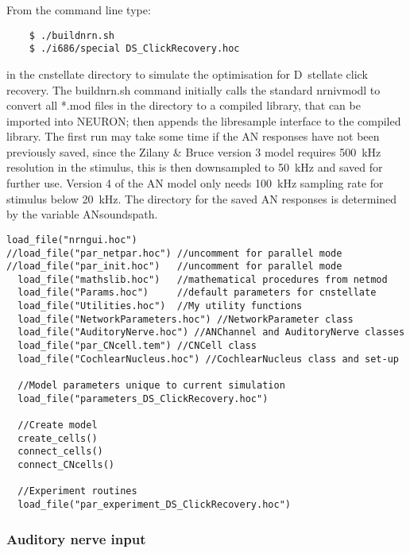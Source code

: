 From the command line type:
\begin{verbatim}
    $ ./buildnrn.sh
    $ ./i686/special DS_ClickRecovery.hoc
\end{verbatim}
in the \textsf{cnstellate} directory to simulate the optimisation for D~stellate
click recovery.  The \textsf{buildnrn.sh} command initially calls the standard
\textsf{nrnivmodl} to convert all *.mod files in the directory to a compiled
library, that can be imported into NEURON; then appends the libresample
interface to the compiled library. The first run may take some time if the AN
responses have not been previously saved, since the Zilany \& Bruce version 3
model requires 500~kHz resolution in the stimulus, this is then downsampled to
50~kHz and saved for further use. Version 4 of the AN model
\citep{ZilanyBruceEtAl:2009} only needs 100~kHz sampling rate for stimulus below
20~kHz. The directory for the saved AN responses is determined by the variable
\textsf{ANsoundspath}.

\begin{lstlisting}[label=lst:headerlines,caption={Headerlines in
    \mbox{\textsf{DS\_ClickRecovery\.hoc}} show a typical setup in a
    \textsf{cnstellate} setup.}]
  load_file("nrngui.hoc")
//load_file("par_netpar.hoc") //uncomment for parallel mode
//load_file("par_init.hoc")   //uncomment for parallel mode
  load_file("mathslib.hoc")   //mathematical procedures from netmod
  load_file("Params.hoc")     //default parameters for cnstellate
  load_file("Utilities.hoc")  //My utility functions
  load_file("NetworkParameters.hoc") //NetworkParameter class
  load_file("AuditoryNerve.hoc") //ANChannel and AuditoryNerve classes
  load_file("par_CNcell.tem") //CNCell class
  load_file("CochlearNucleus.hoc") //CochlearNucleus class and set-up

  //Model parameters unique to current simulation
  load_file("parameters_DS_ClickRecovery.hoc")

  //Create model
  create_cells()
  connect_cells()
  connect_CNcells()

  //Experiment routines
  load_file("par_experiment_DS_ClickRecovery.hoc")

\end{lstlisting}


\subsubsection{Auditory nerve input    \label{sec:APDX:auditory-nerve-input}}

